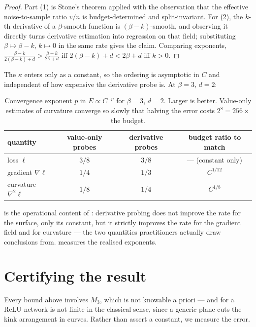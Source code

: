 \documentclass[11pt]{article}
\theoremstyle{definition}
\begin{document}
\begin{proof}
Part (1) is Stone's theorem applied with the observation that the effective
noise-to-sample ratio $v/n$ is budget-determined and split-invariant. For (2), the
$k$-th derivative of a $\beta$-smooth function is $(\beta-k)$-smooth, and observing it
directly turns derivative estimation into regression on that field; substituting
$\beta\mapsto\beta-k$, $k\mapsto0$ in the same rate gives the claim. Comparing
exponents, $\frac{\beta-k}{2(\beta-k)+d}>\frac{\beta-k}{2\beta+d}$ iff
$2(\beta-k)+d<2\beta+d$ iff $k>0$.
\end{proof}

The $\kappa$ enters only as a constant, so the ordering is asymptotic in $C$ and
independent of how expensive the derivative probe is. At $\beta=3$, $d=2$:

\begin{table}[t]
\centering
\caption{Convergence exponent $p$ in $E\propto C^{-p}$ for $\beta=3$, $d=2$. Larger is
better. Value-only estimates of curvature converge so slowly that halving the error
costs $2^{8}=256\times$ the budget.}
\label{tab:rates}
\begin{tabular}{lccc}
\toprule
quantity & value-only probes & derivative probes & budget ratio to match \\
\midrule
loss $\ell$                    & $3/8$ & $3/8$ & --- (constant only) \\
gradient $\nabla\ell$          & $1/4$ & $1/3$ & $C^{1/12}$ \\
curvature $\nabla^2\ell$       & $1/8$ & $1/4$ & $C^{1/8}$ \\
\bottomrule
\end{tabular}
\end{table}

 is the operational content of : derivative probing does
not improve the rate for the surface, only its constant, but it strictly improves the
rate for the gradient field and for curvature --- the two quantities practitioners
actually draw conclusions from.  measures the realised exponents.

\section{Certifying the result}
\label{sec:certify}

Every bound above involves $M_3$, which is not knowable a priori --- and for a ReLU
network is not finite in the classical sense, since a generic plane cuts the kink
arrangement in curves. Rather than assert a constant, we measure the error.
\end{document}
